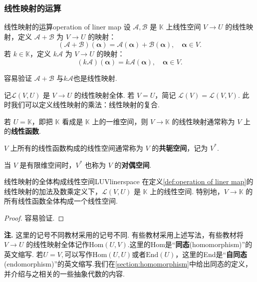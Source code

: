 \documentclass[12pt, a4paper,newtx]{ctexart}
\newenvironment{remark}{\dbend\textbf{注. }}{}{}
\begin{document}
\subsubsection{线性映射的运算}
\begin{definition}{线性映射的运算}{operation of liner map}
	设 $\mathcal{A}, \mathcal{B}$ 是 $\mathbb{K}$ 上线性空间 $V \rightarrow U$ 的线性映射，定义 $\mathcal{A} + \mathcal{B}$ 为 $V \rightarrow U$ 的映射：
	\[
	(\mathcal{A} + \mathcal{B})(\bm\alpha) = \mathcal{A}(\bm\alpha) + \mathcal{B}(\bm\alpha), \quad \bm\alpha \in V.
	\]
	若 $k \in \mathbb{K}$，定义 $k\mathcal{A}$ 为 $V \rightarrow U$ 的映射：
	\[
	(k\mathcal{A})(\bm\alpha) = k\mathcal A(\bm\alpha), \quad \bm\alpha \in V.
	\]
\end{definition}
容易验证 $\mathcal{A} + \mathcal{B}$ 与$k\mathcal A$也是线性映射. 
\begin{definition}{}{}
	记$\mathcal{L}(V, U)$ 是 $V \rightarrow U$ 的线性映射全体. 若 $V = U$，简记 $\mathcal{L}(V)=\mathcal{L}(V, V)$. 此时我们可以定义线性映射的乘法：线性映射的复合. 
	
	若 $U = \mathbb{K}$，即把 $\mathbb{K}$ 看成是 $\mathbb{K}$ 上的一维空间，则 $V \rightarrow \mathbb{K}$ 的线性映射通常称为 $V$ 上的\textbf{线性函数}. 
	
	$V$ 上所有的线性函数构成的线性空间通常称为 $V$ 的\textbf{共轭空间}，记为 $V^*$. 
	
	当 $V$ 是有限维空间时，$V^*$ 也称为 $V$ 的\textbf{对偶空间}. 
\end{definition}
\begin{proposition}{线性映射的全体构成线性空间}{LUVlinerspace}
	 在定义\ref{def:operation of liner map}的线性映射的加法及数乘定义下，$\mathcal{L}(V, U)$ 是 $\mathbb{K}$ 上的线性空间. 特别地，$V \rightarrow \mathbb{K}$ 的所有线性函数全体构成一个线性空间. 
\end{proposition}
\begin{proof}
	容易验证. 
\end{proof}
\begin{remark}
	这里的记号不同教材采用的记号不同. 有些教材采用上述写法，有些教材将$V \rightarrow U$ 的线性映射全体记作$\mathrm{Hom}(U,V).$这里的Hom是“\textbf{同态}(homomorphism)”的英文缩写. 若$U=V,$可以写作$\mathrm{Hom}(U,U)$或者$\mathrm{End}(U)$，这里的End是“\textbf{自同态}(endomorphism)”的英文缩写.我们在\ref{section:homomorphism}中给出同态的定义，并介绍与之相关的一些抽象代数的内容. 
\end{remark}
\end{document}
